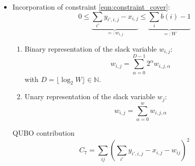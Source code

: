 \documentclass{article}
\begin{document}
\begin{itemize}
\begin{equation*}
    \end{equation*}
\item Incorporation of constraint \eqref{eqn:constraint_cover}:
    \begin{equation*}
        0 \leq \underbrace{\sum_{i'} y_{i', i, j} - x_{i, j}}_{=:w_{i, j}} \leq \underbrace{\sum_i b(i) - 1}_{=:W}
    \end{equation*}
    \begin{enumerate}
        \item 
        Binary representation of the slack variable $w_{i, j}$:
        \begin{equation*}
            w_{i, j} = \sum_{\alpha = 0}^{D - 1} 2^\alpha w_{i, j, \alpha}
        \end{equation*}
        with $D = \lfloor \log_2 W \rfloor \in \mathbb{N}$.
        \item 
        Unary representation of the slack variable $w_j$:
        \begin{equation*}
            w_{i, j} = \sum_{\alpha = 0}^{w} w_{i, j, \alpha}
        \end{equation*}
    \end{enumerate}
    QUBO contribution
    \begin{equation*}
        C_7 = \sum_{ij} \left(\sum_{i'} y_{i', i, j} - x_{i, j} -  w_{ij} \right)^2
    \end{equation*}
\end{itemize}
\end{document}
